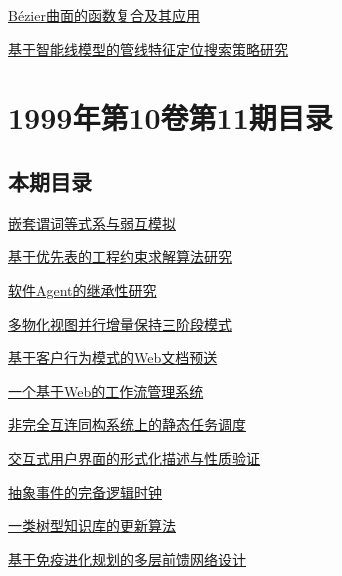 \documentclass[a4paper]{article}
\begin{document}
\href{http://www.jos.org.cn/ch/reader/download_pdf.aspx?file_no=19991214&year_id=1999&quarter_id=12&falg=1}{Bézier曲面的函数复合及其应用}

\href{http://www.jos.org.cn/ch/reader/download_pdf.aspx?file_no=19991215&year_id=1999&quarter_id=12&falg=1}{基于智能线模型的管线特征定位搜索策略研究}


\section{\textbf{1999年第10卷第11期目录}}
\subsection{本期目录}
\href{http://www.jos.org.cn/ch/reader/download_pdf.aspx?file_no=19991101&year_id=1999&quarter_id=11&falg=1}{嵌套谓词等式系与弱互模拟}

\href{http://www.jos.org.cn/ch/reader/download_pdf.aspx?file_no=19991102&year_id=1999&quarter_id=11&falg=1}{基于优先表的工程约束求解算法研究}

\href{http://www.jos.org.cn/ch/reader/download_pdf.aspx?file_no=19991103&year_id=1999&quarter_id=11&falg=1}{软件Agent的继承性研究}

\href{http://www.jos.org.cn/ch/reader/download_pdf.aspx?file_no=19991104&year_id=1999&quarter_id=11&falg=1}{多物化视图并行增量保持三阶段模式}

\href{http://www.jos.org.cn/ch/reader/download_pdf.aspx?file_no=19991105&year_id=1999&quarter_id=11&falg=1}{基于客户行为模式的Web文档预送}

\href{http://www.jos.org.cn/ch/reader/download_pdf.aspx?file_no=19991106&year_id=1999&quarter_id=11&falg=1}{一个基于Web的工作流管理系统}

\href{http://www.jos.org.cn/ch/reader/download_pdf.aspx?file_no=19991107&year_id=1999&quarter_id=11&falg=1}{非完全互连同构系统上的静态任务调度}

\href{http://www.jos.org.cn/ch/reader/download_pdf.aspx?file_no=19991108&year_id=1999&quarter_id=11&falg=1}{交互式用户界面的形式化描述与性质验证}

\href{http://www.jos.org.cn/ch/reader/download_pdf.aspx?file_no=19991109&year_id=1999&quarter_id=11&falg=1}{抽象事件的完备逻辑时钟}

\href{http://www.jos.org.cn/ch/reader/download_pdf.aspx?file_no=19991110&year_id=1999&quarter_id=11&falg=1}{一类树型知识库的更新算法}

\href{http://www.jos.org.cn/ch/reader/download_pdf.aspx?file_no=19991111&year_id=1999&quarter_id=11&falg=1}{基于免疫进化规划的多层前馈网络设计}
\end{document}

